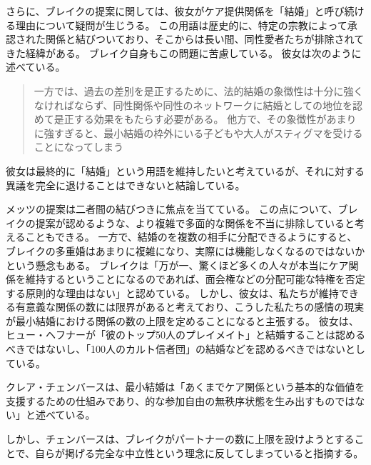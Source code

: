 \documentclass[paper=a4,book,openany]{jlreq}
\newcommand{\ig}[1]{}           %
\begin{document}
さらに、ブレイクの提案に関しては、彼女がケア提供関係を「結婚」と呼び続ける理由について疑問が生じうる。
この用語は歴史的に、特定の宗教によって承認された関係と結びついており、そこからは長い間、同性愛者たちが排除されてきた経緯がある。
ブレイク自身もこの問題に苦慮している。
彼女は次のように述べている。

\begin{quote}
一方では、過去の差別を是正するために、法的結婚の象徴性は十分に強くなければならず、同性関係や同性のネットワークに結婚としての地位を認めて是正する効果をもたらす必要がある。
他方で、その象徴性があまりに強すぎると、最小結婚の枠外にいる子どもや大人がスティグマを受けることになってしまう\citep[p.187]{brake12:_minim_marriag}
\end{quote}

彼女は最終的に「結婚」という用語を維持したいと考えているが、それに対する異議を完全に退けることはできないと結論している。

メッツの提案は二者間の結びつきに焦点を当てている。
この点について、ブレイクの提案が認めるような、より複雑で多面的な関係を不当に排除していると考えることもできる。
一方で、結婚のを複数の相手に分配できるようにすると、ブレイクの多重婚はあまりに複雑になり、実際には機能しなくなるのではないかという懸念もある。
ブレイクは「万が一、驚くほど多くの人々が本当にケア関係を維持するということになるのであれば、面会権などの分配可能な特権を否定する原則的な理由はない」と認めている\citep[p.140]{brake12:_minim_marriag}。
しかし、彼女は、私たちが維持できる有意義な関係の数には限界があると考えており、こうした私たちの感情の現実が最小結婚における関係の数の上限を定めることになると主張する。
彼女は、ヒュー・ヘフナーが「彼のトップ50人のプレイメイト」と結婚することは認めるべきではないし、「100人のカルト信者団」の結婚などを認めるべきではないとしている\citep[p.164]{brake12:_minim_marriag}。

クレア・チェンバースは、最小結婚は「あくまでケア関係という基本的な価値を支援するための仕組みであり、的な参加自由の無秩序状態を生み出すものではない」と述べている\citep[p.96]{chambers17:againstmarriage}。
\ig{Clare chmbers}
しかし、チェンバースは、ブレイクがパートナーの数に上限を設けようとすることで、自らが掲げる完全な中立性という理念に反してしまっていると指摘する。
\end{document}
